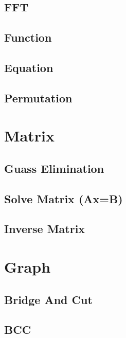 \documentclass[10pt,twocolumn,oneside]{article}
\begin{document}
    \subsection{FFT}
    
    \subsection{Function}
    
    \subsection{Equation}
    
    \subsection{Permutation}
    
    \newpage

    \section{Matrix}
    \subsection{Guass Elimination}
    
    \subsection{Solve Matrix (Ax=B)}
    
    \subsection{Inverse Matrix}
    
    \newpage


    \section{Graph}
    \subsection{Bridge And Cut}
    
    \subsection{BCC}
    
\end{document}
